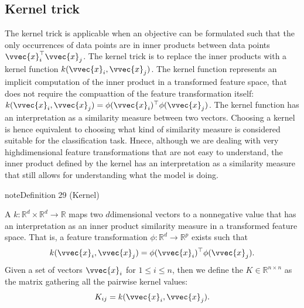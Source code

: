 \documentclass[letterpaper,10pt,english]{jupyterBook}
\begin{document}
\subsection{Kernel trick}
\label{\detokenize{classification_kernel_svm:kernel-trick}}
\sphinxAtStartPar
The kernel trick is applicable when an objective can be formulated such that the only occurrences of data points are in inner products between data points \(\vvec{x}_i^\top\vvec{x}_j\). The kernel trick is to replace the inner products with a kernel function \(k(\vvec{x}_i,\vvec{x}_j)\). The kernel function represents an implicit computation of the inner product in a transformed feature space, that does not require the compuattion of the feature transformation itself: \(k(\vvec{x}_i,\vvec{x}_j)=\phi(\vvec{x}_i)^\top\phi(\vvec{x}_j)\). The kernel function has an interpretation as a similarity measure between two vectors. Choosing a kernel is hence equivalent to choosing what kind of similarity measure is considered suitable for the classification task. Hnece, although we are dealing with very high\sphinxhyphen{}dimensional feature transformations that are not easy to understand, the inner product defined by the kernel has an interpretation as a similarity measure that still allows for understanding what the model is doing.
\label{classification_kernel_svm:definition-0}
\begin{sphinxadmonition}{note}{Definition 29 (Kernel)}



\sphinxAtStartPar
A  \(k:\mathbb{R}^d\times\mathbb{R}^d\rightarrow \mathbb{R}\) maps two \(d\)\sphinxhyphen{}dimensional vectors to a nonnegative value that has an interpretation as an inner product similarity measure in a transformed feature space. That is, a feature transformation \(\phi:\mathbb{R}^d\rightarrow \mathbb{R}^p\) exists such that
\begin{equation*}
\begin{split}k(\vvec{x}_i,\vvec{x}_j) = \phi(\vvec{x}_i)^\top\phi(\vvec{x}_j).\end{split}
\end{equation*}
Given a set of vectors \(\vvec{x}_i\) for \(1\leq i\leq n\), then we define the  \(K\in\mathbb{R}^{n\times n}\) as the matrix gathering all the pairwise kernel values:
\begin{equation*}
\begin{split}K_{ij} = k(\vvec{x}_i,\vvec{x}_j).\end{split}
\end{equation*}
\end{sphinxadmonition}
\end{document}
